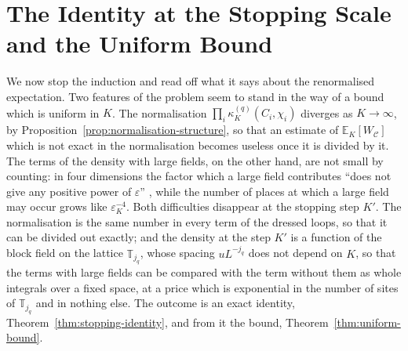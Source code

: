 \documentclass[11pt]{preprint}
\numberwithin{equation}{section}
\theoremstyle{definition}
\theoremstyle{remark}
\theoremstyle{plain}
\begin{document}
\section{The Identity at the Stopping Scale and the Uniform Bound}\label{sec:stopping-scale}

We now stop the induction and read off what it says about the renormalised expectation. Two features of the problem seem to stand in the way of a bound which is uniform in $K$. The normalisation $\prod_i\kappa^{(q)}_K(C_i, \chi_i)$ diverges as $K \to \infty$, by Proposition~\ref{prop:normalisation-structure}, so that an estimate of $\mathbb E_K[W_{\mathcal C}]$ which is not exact in the normalisation becomes useless once it is divided by it. The terms of the density with large fields, on the other hand, are not small by counting: in four dimensions the factor which a large field contributes ``does not give any positive power of $\varepsilon$'' \cite[p.~244]{BalabanCRE}, while the number of places at which a large field may occur grows like $\varepsilon_K^{-4}$. Both difficulties disappear at the stopping step $K'$. The normalisation is the same number in every term of the dressed loops, so that it can be divided out exactly; and the density at the step $K'$ is a function of the block field on the lattice $\mathbb T_{j_q}$, whose spacing $uL^{-j_q}$ does not depend on $K$, so that the terms with large fields can be compared with the term without them as whole integrals over a fixed space, at a price which is exponential in the number of sites of $\mathbb T_{j_q}$ and in nothing else. The outcome is an exact identity, Theorem~\ref{thm:stopping-identity}, and from it the bound, Theorem~\ref{thm:uniform-bound}.
\end{document}
